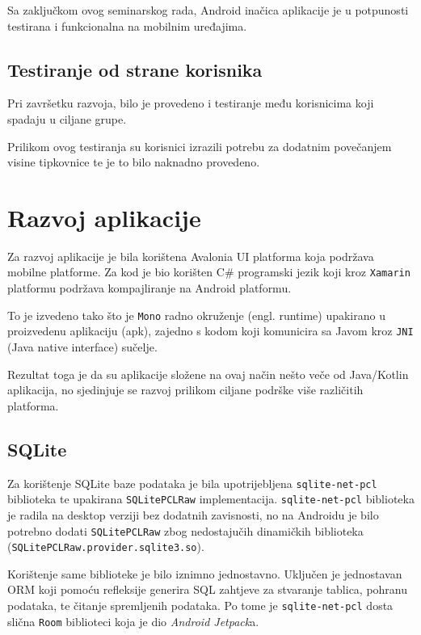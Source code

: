 \documentclass[12pt,a4paper]{report}
\begin{document}
Sa zaključkom ovog seminarskog rada, Android inačica aplikacije je u potpunosti
testirana i funkcionalna na mobilnim uređajima.

\section{Testiranje od strane korisnika}

Pri završetku razvoja, bilo je provedeno i testiranje među korisnicima koji
spadaju u ciljane grupe.

Prilikom ovog testiranja su korisnici izrazili potrebu za dodatnim povečanjem
visine tipkovnice te je to bilo naknadno provedeno.

\chapter{Razvoj aplikacije}

Za razvoj aplikacije je bila korištena Avalonia UI platforma koja podržava
mobilne platforme. Za kod je bio korišten C\# programski jezik koji kroz
\verb|Xamarin| platformu podržava kompajliranje na Android platformu.

To je izvedeno tako što je \verb|Mono| radno okruženje (engl. runtime) upakirano
u proizvedenu aplikaciju (apk), zajedno s kodom koji komunicira sa Javom kroz
\verb|JNI| (Java native interface) sučelje.

Rezultat toga je da su aplikacije složene na ovaj način nešto veče od
Java/Kotlin aplikacija, no sjedinjuje se razvoj prilikom ciljane podrške više
različitih platforma.

\section{SQLite}

Za korištenje SQLite baze podataka je bila upotrijebljena \verb|sqlite-net-pcl|
biblioteka te upakirana \verb|SQLitePCLRaw| implementacija.
\verb|sqlite-net-pcl| biblioteka je radila na desktop verziji bez dodatnih
zavisnosti, no na Androidu je bilo potrebno dodati \verb|SQLitePCLRaw| zbog
nedostajučih dinamičkih biblioteka\\(\verb|SQLitePCLRaw.provider.sqlite3.so|).

Korištenje same biblioteke je bilo iznimno jednostavno. Uključen je jednostavan
ORM koji pomoću refleksije generira SQL zahtjeve za stvaranje tablica, pohranu
podataka, te čitanje spremljenih podataka. Po tome je \verb|sqlite-net-pcl|
dosta slična \verb|Room| biblioteci koja je dio \textit{Android Jetpack}a.
\end{document}
